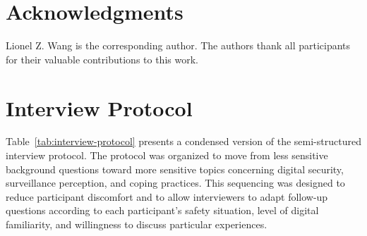 \documentclass[conference,compsoc]{IEEEtran}
\begin{document}
\section*{Acknowledgments}

Lionel Z. Wang is the corresponding author. The authors thank all participants for their valuable contributions to this work.





% 







\clearpage
\onecolumn %
\appendices



\section{Interview Protocol}
Table~\ref{tab:interview-protocol} presents a condensed version of the semi-structured interview protocol. The protocol was organized to move from less sensitive background questions toward more sensitive topics concerning digital security, surveillance perception, and coping practices. This sequencing was designed to reduce participant discomfort and to allow interviewers to adapt follow-up questions according to each participant's safety situation, level of digital familiarity, and willingness to discuss particular experiences.

\end{document}
